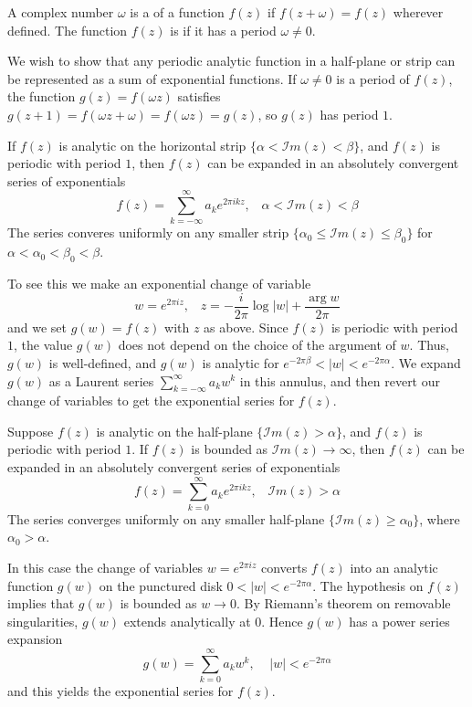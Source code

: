 \documentclass[12pt, a4paper, oneside, openright, titlepage]{book}
\begin{document}
\begin{defn}
    A complex number $\omega$ is a  of a function $f(z)$ if $f(z+\omega) = f(z)$ wherever defined. The function $f(z)$ is  if it has a period $\omega \neq 0$.
\end{defn}

We wish to show that any periodic analytic function in a half-plane or strip can be represented as a sum of exponential functions. If $\omega \neq 0$ is a period of $f(z)$, the function $g(z) = f(\omega z)$ satisfies $g(z+1) = f(\omega z+\omega) = f(\omega z) = g(z)$, so $g(z)$ has period $1$. 

\begin{thm}
    If $f(z)$ is analytic on the horizontal strip $\{\alpha < \mathscr{I}m(z) < \beta\}$, and $f(z)$ is periodic with period $1$, then $f(z)$ can be expanded in an absolutely convergent series of exponentials \begin{equation*}
        f(z) = \sum_{k=-\infty}^{\infty}a_ke^{2\pi ikz},\;\;\;\alpha < \mathscr{I}m(z) < \beta
    \end{equation*}
    The series converes uniformly on any smaller strip $\{\alpha_0 \leq \mathscr{I}m(z) \leq \beta_0\}$ for $\alpha < \alpha_0 < \beta_0 < \beta$.
\end{thm}
To see this we make an exponential change of variable \begin{equation*}
    w = e^{2\pi iz},\;\;\;z = -\frac{i}{2\pi}\log|w| + \frac{\arg w}{2\pi}
\end{equation*}
and we set $g(w) = f(z)$ with $z$ as above. Since $f(z)$ is periodic with period $1$, the value $g(w)$ does not depend on the choice of the argument of $w$. Thus, $g(w)$ is well-defined, and $g(w)$ is analytic for $e^{-2\pi \beta} < |w| < e^{-2\pi \alpha}$. We expand $g(w)$ as a Laurent series $\sum_{k=-\infty}^{\infty}a_kw^k$ in this annulus, and then revert our change of variables to get the exponential series for $f(z)$.

\begin{thm}
    Suppose $f(z)$ is analytic on the half-plane $\{\mathscr{I}m(z) > \alpha\}$, and $f(z)$ is periodic with period $1$. If $f(z)$ is bounded as $\mathscr{I}m(z)\rightarrow \infty$, then $f(z)$ can be expanded in an absolutely convergent series of exponentials \begin{equation*}
        f(z) = \sum_{k=0}^{\infty}a_ke^{2\pi ikz},\;\;\;\mathscr{I}m(z) > \alpha
    \end{equation*}
    The series converges uniformly on any smaller half-plane $\{\mathscr{I}m(z) \geq \alpha_0\}$, where $\alpha_0 > \alpha$.
\end{thm}
In this case the change of variables $w = e^{2\pi iz}$ converts $f(z)$ into an analytic function $g(w)$ on the punctured disk $0 < |w| < e^{-2\pi \alpha}$. The hypothesis on $f(z)$ implies that $g(w)$ is bounded as $w\rightarrow 0$. By Riemann's theorem on removable singularities, $g(w)$ extends analytically at $0$. Hence $g(w)$ has a power series expansion \begin{equation*}
    g(w) = \sum_{k=0}^{\infty}a_kw^k,\;\;\;\;|w| < e^{-2\pi \alpha}
\end{equation*}
and this yields the exponential series for $f(z)$. 
\end{document}

